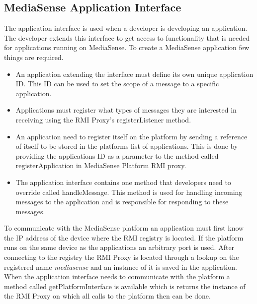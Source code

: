 \subsection{MediaSense Application Interface}
The application interface is used when a developer is developing an application. The developer extends this interface to get access to functionality that is needed for applications running on MediaSense. 
To create a MediaSense application few things are required. 

\begin{itemize}
  \item An application extending the interface must define its own unique application ID. This ID can be used to set the scope of a message to a specific application. 
  \item Applications must register what types of messages they are interested in receiving using the RMI Proxy's registerListener method. 
  \item An application need to register itself on the platform by sending a reference of itself to be stored in the platforms list of applications. This is done by providing the applications ID as a parameter to the method called registerApplication in MediaSense Platform RMI proxy.
  \item The application interface contains one method that developers need to override called handleMessage. This method is used for handling incoming messages to the application and is responsible for responding to these messages. 
\end{itemize}

To communicate with the MediaSense platform an application must first know the IP address of the device where the RMI registry is located. If the platform runs on the same device as the applications an arbitrary port is used. After connecting to the registry the RMI Proxy is located through a lookup on the registered name \emph{mediasense} and an instance of it is saved in the application. When the application interface needs to communicate with the platform a method called getPlatformInterface is available which is returns the instance of the RMI Proxy on which all calls to the platform then can be done.

